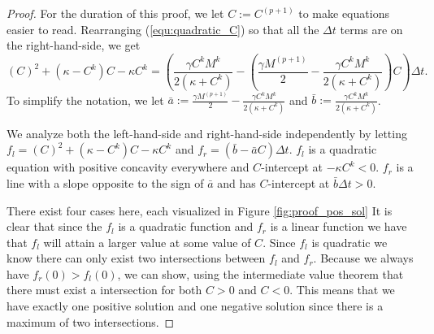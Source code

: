 \begin{proof}
  For the duration of this proof, we let $C := C^{(p+1)}$ to make equations easier to read.
  Rearranging (\ref{equ:quadratic_C}) so that all the $\Delta t$ terms are on the right-hand-side, we get
  \begin{equation}
    \left( C \right)^2 + \left(\kappa - C^{k}\right)C - \kappa C^{k} =  \left(\frac{\gamma C^k M^k}{2\left(\kappa + C^k\right)} - \left(\frac{\gamma M^{(p+1)}}{2} - \frac{\gamma C^k M^k}{2 \left(\kappa + C^k\right)} \right)C \right) \Delta t.
  \end{equation}
  To simplify the notation, we let $\bar{a} := \frac{\gamma M^{(p+1)}}{2} - \frac{\gamma C^k M^k}{2\left(\kappa + C^k\right)}$ and $\bar{b} := \frac{\gamma C^k M^k}{2\left(\kappa + C^k\right)}$.
  
  We analyze both the left-hand-side and right-hand-side independently by letting $f_l = \left( C \right)^2 + \left(\kappa - C^{k}\right)C - \kappa C^{k}$ and $f_r =  \left(\bar{b} - \bar{a} C \right) \Delta t$.
  $f_l$ is a quadratic equation with positive concavity everywhere and $C$-intercept at $-\kappa C^{k} < 0$.
  $f_r$ is a line with a slope opposite to the sign of $\bar{a}$ and has $C$-intercept at $\bar{b}\Delta t > 0$.
  
  There exist four cases here, each visualized in Figure \ref{fig:proof_pos_sol}
  It is clear that since the $f_l$ is a quadratic function and $f_r$ is a linear function we have that $f_l$ will attain a larger value at some value of $C$. 
  Since $f_l$ is quadratic we know there can only exist two intersections between $f_l$ and $f_r$.
  Because we always have $f_r(0) > f_l(0)$, we can show, using the intermediate value theorem that there must exist a intersection for both $C >0$ and $C < 0$.
  This means that we have exactly one positive solution and one negative solution since there is a maximum of two intersections.
\end{proof}

